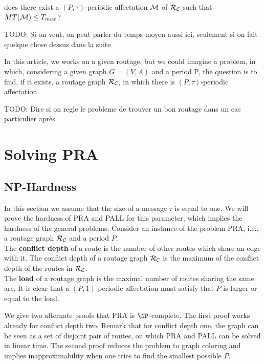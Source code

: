 \documentclass[a4paper,10pt]{article}
\newcommand{\todo}[1]{{\color{red} TODO: {#1}}}
\begin{document}
       does there exist a $(P,\tau)$-periodic affectation ${\cal M}$ of ${\cal R}_{\cal C}$ such that $MT({\cal M}) \leq T_{max}$?

      \todo{Si on veut, on peut parler du temps moyen aussi ici, seulement si on fait quelque chose dessus dans la suite}



  In this article, we works on a given routage, but we could imagine a problem, in which, considering a given graph $G = (V,A)$ and a period P, the question is to find, if it exists, a routage graph ${\cal R}_{\cal C}$, in which there is $(P,\tau)$-periodic affectation.
  
  
  \todo{Dire si on regle le probleme de trouver un bon routage dans un cas particulier après}
  
  
\section{Solving PRA}
  \label{sec:complexity}
  \subsection{NP-Hardness}

 In this section we assume that the size of a message $\tau$ is equal to one. 
 We will prove the hardness of PRA and PALL for this parameter, which implies the hardness of the general problems. 
Consider an instance of the problem PRA, i.e., a routage graph $\cal{R_{\cal C}}$ and a period $P$. \\
The {\bf conflict depth} of a route is the number of other routes which share an edge with it. 
The conflict depth of a routage graph  $\cal{R_{\cal C}}$ is the maximum of the conflict depth of the routes in $\cal{R_{\cal C}}$.\\
The {\bf load} of a routage graph is the maximal number of routes sharing the same arc.
It is clear that a $(P,1)$-periodic affectation must satisfy that $P$ is larger or equal to the load.


We give two alternate proofs that PRA is $\NP$-complete.
The first proof works already for conflict depth two. Remark that for conflict depth one,
the graph can be seen as a set of disjoint pair of routes, on which PRA and PALL can be solved in linear time. 
 The second proof reduces the problem to graph coloring and implies inapproximability when one tries to find the smallest possible $P$. \\
\end{document}
